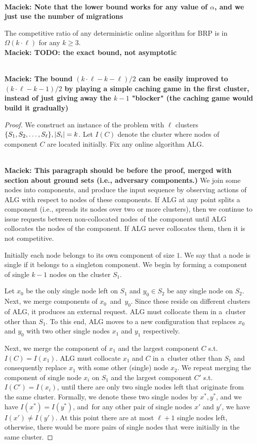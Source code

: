 \documentclass[manuscript,screen=true, review, anonymous]{acmart}
\newcommand{\ALG}{\textsf{ALG}\xspace}
\newcommand{\OBRP}{BRP}
\newcommand{\PPOBRP}{PP-BRP}
\DeclarePairedDelimiter\set{\{}{\}}
\newcommand\maciek[1]{\color{brown}\textbf{\\ Maciek: #1}\color{black}}
\begin{document}
\maciek{Note that the lower bound works for any value of $\alpha$, and we just use the number of migrations}

\begin{theorem}
  The competitive ratio of any deterministic online algorithm for \OBRP{} is in $\Omega(k\cdot \ell)$ for any $k\geq 3$.
  \maciek{TODO: the exact bound, not asymptotic}

  \maciek{The bound $(k \cdot \ell - k - \ell) / 2$ can be easily improved to $(k \cdot \ell - k - 1) / 2$ by playing a simple caching game in the first cluster, instead of just giving away the $k-1$ "blocker" (the caching game would build it gradually)}
\end{theorem}

\begin{proof}
	We construct an instance of the problem with $\ell$ clusters 
	$\set{ S_1, S_2,\dots , S_{\ell}}, |S_i|  = k$.
	Let $I(C)$ denote the cluster where nodes of component $C$ are located initially.
  Fix any online algorithm \ALG{}.
  
  \maciek{This paragraph should be before the proof, merged with section about ground sets (i.e., adversary components.)}
  We join some nodes into components, and produce the input sequence by observing actions of \ALG{} with respect to nodes of these components.
	If \ALG{} at any point splits a component
	(i.e., spreads its nodes over two or more clusters),
	then we continue to issue requests between non-collocated nodes of the component until \ALG{} collocates the nodes of the component.
	If \ALG{} never collocates them, then it is not competitive.

  Initially each node belongs to its own component of size $1$.
  We say that a node is single if it belongs to a singleton component.
  We begin by forming a component of single $k-1$ nodes on the cluster $S_1$.
  
	Let $x_0$  be the only single node left on $S_1$ and  $y_0 \in S_2$ be any single node on $S_2$.
	Next,
	we merge components of $x_0$~and~$y_0$.
  Since these reside on different clusters of \ALG{}, it produces an external request.
  \ALG{} must collocate them in a~cluster other than $S_1$.
	To this end,
	\ALG{} moves to a new configuration
	that replaces $x_0$ and $y_0$ with two other single nodes $x_1$ and $y_1$ respectively.
	
	Next,
	we merge the component of $x_1$ and the largest component $C$ s.t.~$I(C) = I(x_1)$.
	\ALG{} must collocate $x_1$ and $C$ in a~cluster other than $S_1$ and
	consequently replace $x_1$ with some other (single) node $x_2$.
	We repeat merging the component of single node $x_i$ on $S_1$ and the largest component $C'$ s.t.~$I(C')=I(x_i)$,
  until there are only two single nodes left that  originate from the same cluster.
	Formally, we denote these two single nodes by $x^*, y^*$, and we have $I(x^*) = I(y^*)$, and~for any other pair of single nodes
	$x'$ and $y'$,
	we have $I(x') \neq I(y')$.
	At this point there are at most $\ell+1$ single nodes left,
	otherwise, there would be more pairs of single nodes that were initially in the same cluster.
	

\end{proof}
\end{document}

